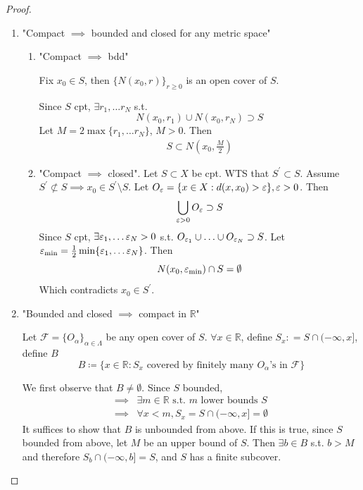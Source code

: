 \begin{proof}
    \begin{enumerate}
        \item "Compact $\implies$ bounded and closed for any metric space"
        \begin{enumerate}
            \item "Compact $\implies$ bdd"
            \medskip 

            Fix $x_0 \in S$, then $\{ N(x_0, r) \}_{r \geq 0} $ is an open cover of $S$. 
            \medskip 

            Since $S$ cpt, $\exists r_1, \hdots r_N$
            s.t. 
            \[
                N(x_0, r_1) \cup N(x_0, r_N) \supset S
            \]
            Let $M = 2 \max \{ r_1, \hdots r_N \} $, $M > 0$. 
            Then 
            \begin{align*}
                S \subset N  \left( x_0, \frac{M}{2}\right) 
            \end{align*}
            \item "Compact $\implies$ closed". Let $S \subset X$ be cpt. WTS that $S^{\prime} \subset S$. 
            Assume $S^{\prime} \not\subset S \implies x_0 \in S^{\prime} \setminus S$. 
            Let $O_{\varepsilon} = \{ x \in X: d(x, x_0) > \varepsilon \}, \varepsilon > 0$. Then 
            \[
            \bigcup_{\varepsilon > 0} O_{\varepsilon} \supset S
            \]
            Since $S$ cpt, $\exists \varepsilon_1, \hdots \varepsilon_{N} > 0$ s.t. 
            $O_{\varepsilon_1} \cup \hdots \cup O_{\varepsilon_N} \supset S$. 
            Let $\varepsilon_{\min} = \frac{1}{2} \min \{ \varepsilon_1, \hdots \varepsilon_N \} $. 
            Then 
            \[
                N(x_0, \varepsilon_{\min}) \cap S = \emptyset
            \]
            Which contradicts $x_0 \in S^{\prime}$.
        \end{enumerate}
        \item "Bounded and closed $\implies$ compact in $\mathbb{R}$"
        \medskip 

        Let $\mathcal{F} = \{ O_{\alpha} \}_{\alpha \in \Lambda} $  be any open cover of $S$.  
        $\forall x \in \mathbb{R}$, define $S_x: = S \cap (-\infty, x]$, define $B$
        \[
            B \coloneq \{ 
                x \in \mathbb{R}: S_x \text{ covered by finitely many } O_{\alpha}\text{'s in } \mathcal{F}
            \} 
        \]

        We first observe that $B \neq \emptyset$. Since $S$ bounded, 
        \begin{align*}
            \implies & \exists m \in \mathbb{R} \text{ s.t. } m \text{ lower bounds } S \\
            \implies & \forall x < m, S_x = S \cap (-\infty, x] = \emptyset
        \end{align*}
        It suffices to show that $B$ is unbounded from above. If this is true, since $S$ bounded from above,
        let $M$ be an upper bound of $S$. Then $\exists b \in B$ 
        s.t. $b > M$ and therefore $S_b \cap (-\infty, b] = S$, and $S$ has a finite subcover.
        \medskip


\end{enumerate}
\end{proof}

